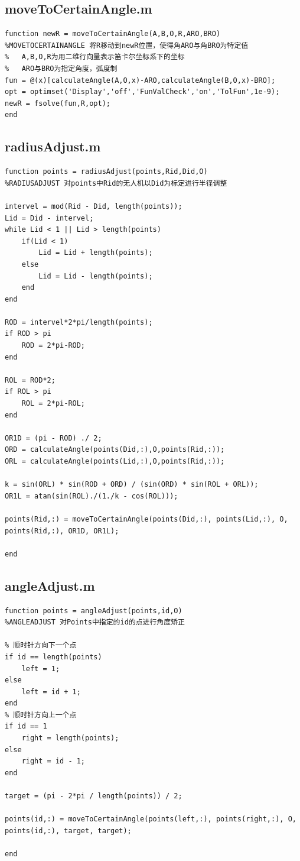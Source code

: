 \documentclass[12pt,AutoFakeSlant,AutoFakeBold]{article}
\begin{document}
\subsection{moveToCertainAngle.m}
\begin{verbatim}
function newR = moveToCertainAngle(A,B,O,R,ARO,BRO)
%MOVETOCERTAINANGLE 将R移动到newR位置，使得角ARO与角BRO为特定值
%   A,B,O,R为用二维行向量表示笛卡尔坐标系下的坐标
%   ARO与BRO为指定角度，弧度制
fun = @(x)[calculateAngle(A,O,x)-ARO,calculateAngle(B,O,x)-BRO];
opt = optimset('Display','off','FunValCheck','on','TolFun',1e-9);
newR = fsolve(fun,R,opt);
end
\end{verbatim}

\subsection{radiusAdjust.m}
\begin{verbatim}
function points = radiusAdjust(points,Rid,Did,O)
%RADIUSADJUST 对points中Rid的无人机以Did为标定进行半径调整

intervel = mod(Rid - Did, length(points));
Lid = Did - intervel;
while Lid < 1 || Lid > length(points)
    if(Lid < 1)
        Lid = Lid + length(points);
    else
        Lid = Lid - length(points);
    end
end

ROD = intervel*2*pi/length(points);
if ROD > pi
    ROD = 2*pi-ROD;
end

ROL = ROD*2;
if ROL > pi
    ROL = 2*pi-ROL;
end

OR1D = (pi - ROD) ./ 2;
ORD = calculateAngle(points(Did,:),O,points(Rid,:));
ORL = calculateAngle(points(Lid,:),O,points(Rid,:));

k = sin(ORL) * sin(ROD + ORD) / (sin(ORD) * sin(ROL + ORL));
OR1L = atan(sin(ROL)./(1./k - cos(ROL)));

points(Rid,:) = moveToCertainAngle(points(Did,:), points(Lid,:), O, points(Rid,:), OR1D, OR1L);

end
\end{verbatim}

\subsection{angleAdjust.m}
\begin{verbatim}
function points = angleAdjust(points,id,O)
%ANGLEADJUST 对Points中指定的id的点进行角度矫正

% 顺时针方向下一个点
if id == length(points)
    left = 1;
else
    left = id + 1;
end
% 顺时针方向上一个点
if id == 1
    right = length(points);
else
    right = id - 1;
end

target = (pi - 2*pi / length(points)) / 2;

points(id,:) = moveToCertainAngle(points(left,:), points(right,:), O, points(id,:), target, target);

end
\end{verbatim}
\end{document}
